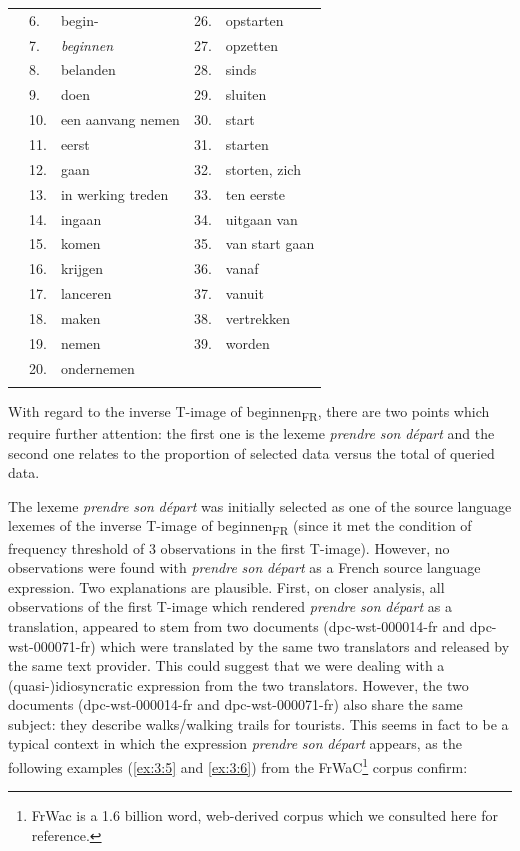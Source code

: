 \begin{table}
\begin{tabularx}{\textwidth}{p{}lXlX}
\rowcolor{lsLightGray}& 6.& begin- & 26.& opstarten\\
\rowcolor{lsLightGray}& 7.& \textit{beginnen} & 27.& opzetten\\
\rowcolor{lsLightGray}& 8.& belanden & 28.& sinds\\
\rowcolor{lsLightGray}& 9.& doen & 29.& sluiten\\
\rowcolor{lsLightGray}& 10.& een aanvang nemen & 30.& start\\
\rowcolor{lsLightGray}& 11.& eerst & 31.& starten\\
\rowcolor{lsLightGray}& 12.& gaan & 32.& storten, zich\\
\rowcolor{lsLightGray}& 13.& in werking treden & 33.& ten eerste\\
\rowcolor{lsLightGray}& 14.& ingaan & 34.& uitgaan van\\
\rowcolor{lsLightGray}& 15.& komen & 35.& van start gaan\\
\rowcolor{lsLightGray}& 16.& krijgen & 36.& vanaf\\
\rowcolor{lsLightGray}& 17.& lanceren & 37.& vanuit\\
\rowcolor{lsLightGray}& 18.& maken & 38.& vertrekken\\
\rowcolor{lsLightGray}& 19.& nemen & 39.& worden\\
\rowcolor{lsLightGray}& 20.& ondernemen && \\
\lspbottomrule
\end{tabularx}
\end{table}

With regard to the inverse T-image of beginnen\textsubscript{FR}, there are two points which require further attention: the first one is the lexeme \textit{prendre} \textit{son} \textit{départ} and the second one relates to the proportion of selected data versus the total of queried data.

The lexeme \textit{prendre} \textit{son} \textit{départ} was initially selected as one of the source language lexemes of the inverse T-image of beginnen\textsubscript{FR} (since it met the condition of frequency threshold of 3 observations in the first T-image). However, no observations were found with \textit{prendre} \textit{son} \textit{départ} as a French source language expression. Two explanations are plausible. First, on closer analysis, all observations of the first T-image which rendered \textit{prendre} \textit{son} \textit{départ} as a translation, appeared to stem from two documents (dpc-wst-000014-fr and dpc-wst-000071-fr) which were translated by the same two translators and released by the same text provider. This could suggest that we were dealing with a (quasi-)idiosyncratic expression from the two translators. However, the two documents (dpc-wst-000014-fr and dpc-wst-000071-fr) also share the same subject: they describe walks\slash walking trails for tourists. This seems in fact to be a typical context in which the expression \textit{prendre} \textit{son} \textit{départ} appears, as the following examples (\ref{ex:3:5} and \ref{ex:3:6}) from the FrWaC\footnote{FrWac is a 1.6 billion word, web-derived corpus \citep{xiao_web_2010} which we consulted here for reference.} corpus confirm:

